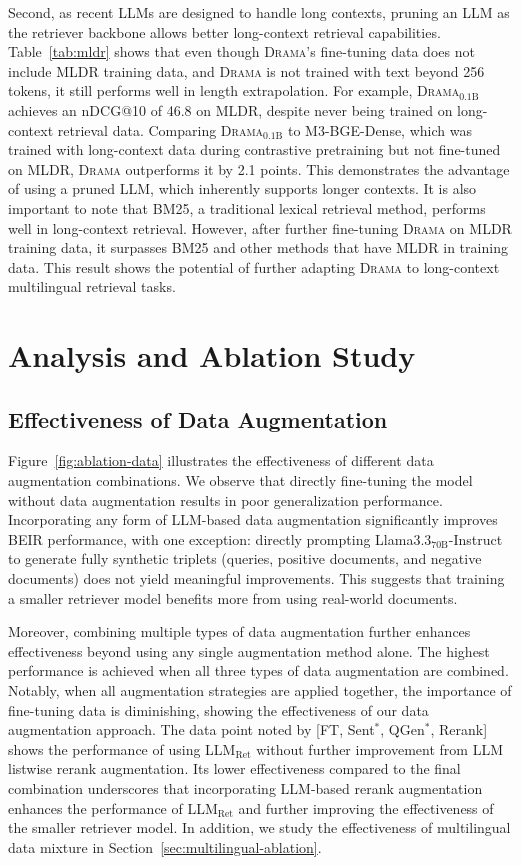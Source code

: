 \documentclass[]{fairmeta}
\newcommand{\ourmodel}{\textsc{Drama}}
\begin{document}
Second, as recent LLMs are designed to handle long contexts, pruning an LLM as the retriever backbone allows better long-context retrieval capabilities.
Table~\ref{tab:mldr} shows that even though \ourmodel{}’s fine-tuning data does not include MLDR training data, and \ourmodel{} is not trained with text beyond 256 tokens, it still performs well in length extrapolation.
For example, \ourmodel{}$_\text{0.1B}$ achieves an nDCG@10 of 46.8 on MLDR, despite never being trained on long-context retrieval data.
Comparing \ourmodel{}$_\text{0.1B}$ to M3-BGE-Dense, which was trained with long-context data during contrastive pretraining but not fine-tuned on MLDR, \ourmodel{} outperforms it by 2.1 points.
This demonstrates the advantage of using a pruned LLM, which inherently supports longer contexts.
It is also important to note that BM25, a traditional lexical retrieval method, performs well in long-context retrieval.
However, after further fine-tuning \ourmodel{} on MLDR training data, it surpasses BM25 and other methods that have MLDR in training data.
This result shows the potential of further adapting \ourmodel{} to long-context multilingual retrieval tasks.

\section{Analysis and Ablation Study}
\subsection{Effectiveness of Data Augmentation}
\label{ablation:data}

Figure~\ref{fig:ablation-data} illustrates the effectiveness of different data augmentation combinations.
We observe that directly fine-tuning the model without data augmentation results in poor generalization performance. 
Incorporating any form of LLM-based data augmentation significantly improves BEIR performance, with one exception: directly prompting Llama3.3$_\text{70B}$-Instruct to generate fully synthetic triplets (queries, positive documents, and negative documents) does not yield meaningful improvements.
This suggests that training a smaller retriever model benefits more from using real-world documents.

Moreover, combining multiple types of data augmentation further enhances effectiveness beyond using any single augmentation method alone.
The highest performance is achieved when all three types of data augmentation are combined. 
Notably, when all augmentation strategies are applied together, the importance of fine-tuning data is diminishing, showing the effectiveness of our data augmentation approach.
The data point noted by [FT, Sent$^*$, QGen$^*$, Rerank] shows the performance of using LLM$_\text{Ret}$ without further improvement from LLM listwise rerank augmentation.
Its lower effectiveness compared to the final combination underscores that incorporating LLM-based rerank augmentation enhances the performance of LLM$_\text{Ret}$ and further improving the effectiveness of the smaller retriever model.
In addition, we study the effectiveness of multilingual data mixture in Section~\ref{sec:multilingual-ablation}.
\end{document}
